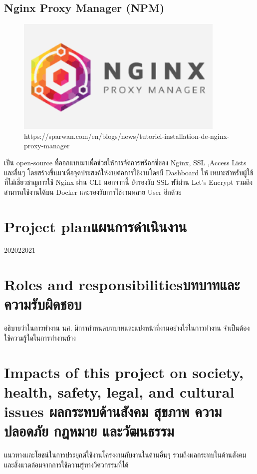 \subsection{Nginx Proxy Manager (NPM)}
\begin{figure}[H]
  \centering
  \includegraphics[width=100mm, keepaspectratio ]{pictures/npm.png}
  \caption[Poem]{https://sparwan.com/en/blogs/news/tutoriel-installation-de-nginx-proxy-manager}
\end{figure}
\hspace{1.27cm}เป็น open-source ที่ออกแบบมาเพื่อช่วยให้การจัดการพร็อกซีของ Nginx, SSL ,Access Lists และอื่นๆ โดยสร้างขึ้นมาเพื่อจุดประสงค์ให้ง่ายต่อการใช้งานโดยมี Dashboard ให้ เหมาะสำหรับผู้ใช้ที่ไม่เชี่ยวชาญการใช้ Nginx ผ่าน CLI นอกจากนี้ ยังรองรับ SSL ฟรีผ่าน Let's Encrypt รวมถึงสามารถใช้งานได้บน Docker และรองรับการใช้งานหลาย User อีกด้วย

\section{\ifenglish Project plan\else แผนการดำเนินงาน\fi}

\begin{plan}{6}{2020}{2}{2021}
\end{plan}

\section{\ifenglish Roles and responsibilities\else บทบาทและความรับผิดชอบ\fi}
อธิบายว่าในการทำงาน นศ. มีการกำหนดบทบาทและแบ่งหน้าที่งานอย่างไรในการทำงาน จำเป็นต้องใช้ความรู้ใดในการทำงานบ้าง

\section{\ifenglish%
Impacts of this project on society, health, safety, legal, and cultural issues
\else%
ผลกระทบด้านสังคม สุขภาพ ความปลอดภัย กฎหมาย และวัฒนธรรม
\fi}

แนวทางและโยชน์ในการประยุกต์ใช้งานโครงงานกับงานในด้านอื่นๆ รวมถึงผลกระทบในด้านสังคมและสิ่งแวดล้อมจากการใช้ความรู้ทางวิศวกรรมที่ได้
